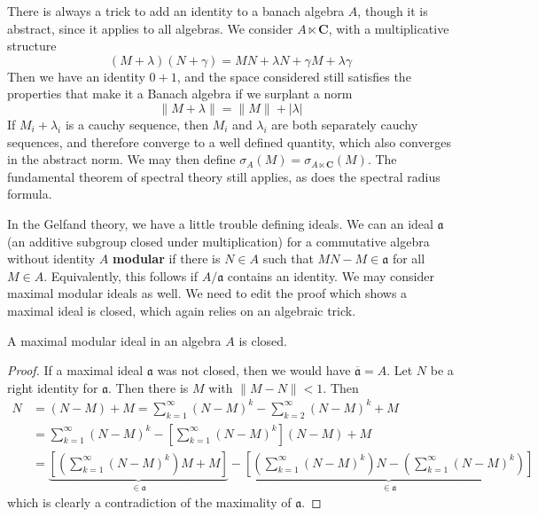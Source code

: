 There is always a trick to add an identity to a banach algebra $A$, though it is abstract, since it applies to all algebras. We consider $A \ltimes \mathbf{C}$, with a multiplicative structure
%
\[ (M + \lambda)(N + \gamma) = MN + \lambda N + \gamma M + \lambda \gamma \]
%
Then we have an identity $0 + 1$, and the space considered still satisfies the properties that make it a Banach algebra if we surplant a norm
%
\[ \| M + \lambda \| = \| M \| + |\lambda| \]
%
If $M_i + \lambda_i$ is a cauchy sequence, then $M_i$ and $\lambda_i$ are both separately cauchy sequences, and therefore converge to a well defined quantity, which also converges in the abstract norm. We may then define $\sigma_A(M) = \sigma_{A \ltimes \mathbf{C}}(M)$. The fundamental theorem of spectral theory still applies, as does the spectral radius formula.

In the Gelfand theory, we have a little trouble defining ideals. We can an ideal $\mathfrak{a}$ (an additive subgroup closed under multiplication) for a commutative algebra without identity $A$ {\bf modular} if there is $N \in A$ such that $MN - M \in \mathfrak{a}$ for all $M \in A$. Equivalently, this follows if $A/\mathfrak{a}$ contains an identity. We may consider maximal modular ideals as well. We need to edit the proof which shows a maximal ideal is closed, which again relies on an algebraic trick.

\begin{lemma}
    A maximal modular ideal in an algebra $A$ is closed.
\end{lemma}
\begin{proof}
    If a maximal ideal $\mathfrak{a}$ was not closed, then we would have $\overline{\mathfrak{a}} = A$. Let $N$ be a right identity for $\mathfrak{a}$. Then there is $M$ with $\| M - N \| < 1$. Then
    \begin{align*}
        N &= (N - M) + M = \sum_{k = 1}^\infty (N - M)^k - \sum_{k = 2}^\infty (N - M)^k + M\\
        &= \sum_{k = 1}^\infty (N - M)^k - \left[ \sum_{k = 1}^\infty (N - M)^k \right] (N - M) + M\\
        &= \underbrace{\left[ \left( \sum_{k = 1}^\infty (N - M)^k \right) M + M \right]}_{\in \mathfrak{a}} - \underbrace{\left[ \left( \sum_{k = 1}^\infty (N - M)^k \right) N - \left( \sum_{k = 1}^\infty (N - M)^k \right) \right]}_{\in \mathfrak{a}}
    \end{align*}
    which is clearly a contradiction of the maximality of $\mathfrak{a}$.
\end{proof}

